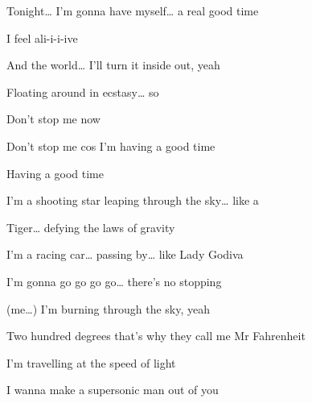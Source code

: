 \begin{song}


\begin{vchordbox}
\vspace{-2em}
\par
{}
\par
{}\par
{}\par
{}
\par
{}\par
{}\par
\end{vchordbox}

\large

\bigskip

Tonight… I’m gonna have myself… a real good time \par
I feel ali-i-i-ive \par
And the world… I’ll turn it inside out, yeah \par
{}Floating around in ecstasy… so \par
{}Don’t stop me now \par
{}Don’t stop me cos I’m having a good time \par
{}Having a good time \par

\bigskip

I’m a shooting star leaping through the sky… like a \par
Tiger… defying the laws of gravity \par
I’m a racing car… passing by… like Lady Godiva \par
I’m gonna go go go go… there’s no stopping \par

\bigskip

\begin{chorusbox}{\PrechorusAndChorus}
(me…) I’m burning through the sky, yeah \par
Two hundred degrees that’s why they call me Mr Fahrenheit \par
I’m travelling at the speed of light \par
I wanna make a supersonic man out of you


\end{chorusbox}
\end{song}
